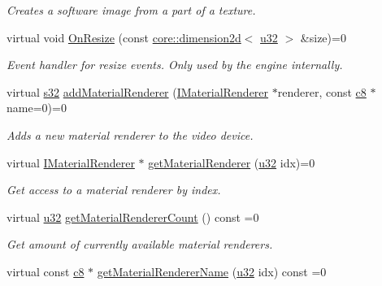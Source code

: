 \begin{DoxyCompactItemize}
\begin{DoxyCompactList}\small\item\em Creates a software image from a part of a texture. \end{DoxyCompactList}\item 
virtual void \hyperlink{classirr_1_1video_1_1IVideoDriver_a1a236e1233fc6fc2c5f36aaa830814fc}{On\+Resize} (const \hyperlink{classirr_1_1core_1_1dimension2d}{core\+::dimension2d}$<$ \hyperlink{namespaceirr_a0416a53257075833e7002efd0a18e804}{u32} $>$ \&size)=0
\begin{DoxyCompactList}\small\item\em Event handler for resize events. Only used by the engine internally. \end{DoxyCompactList}\item 
virtual \hyperlink{namespaceirr_ac66849b7a6ed16e30ebede579f9b47c6}{s32} \hyperlink{classirr_1_1video_1_1IVideoDriver_a0dfc3a7168f3a73a6f4323b579f03ff6}{add\+Material\+Renderer} (\hyperlink{classirr_1_1video_1_1IMaterialRenderer}{I\+Material\+Renderer} $\ast$renderer, const \hyperlink{namespaceirr_a9395eaea339bcb546b319e9c96bf7410}{c8} $\ast$name=0)=0
\begin{DoxyCompactList}\small\item\em Adds a new material renderer to the video device. \end{DoxyCompactList}\item 
virtual \hyperlink{classirr_1_1video_1_1IMaterialRenderer}{I\+Material\+Renderer} $\ast$ \hyperlink{classirr_1_1video_1_1IVideoDriver_accb321dfb32ad3c76efb99427bc90cc8}{get\+Material\+Renderer} (\hyperlink{namespaceirr_a0416a53257075833e7002efd0a18e804}{u32} idx)=0
\begin{DoxyCompactList}\small\item\em Get access to a material renderer by index. \end{DoxyCompactList}\item 
virtual \hyperlink{namespaceirr_a0416a53257075833e7002efd0a18e804}{u32} \hyperlink{classirr_1_1video_1_1IVideoDriver_ac1d0e2e952afdcdbdd915dc106375381}{get\+Material\+Renderer\+Count} () const =0
\begin{DoxyCompactList}\small\item\em Get amount of currently available material renderers. \end{DoxyCompactList}\item 
virtual const \hyperlink{namespaceirr_a9395eaea339bcb546b319e9c96bf7410}{c8} $\ast$ \hyperlink{classirr_1_1video_1_1IVideoDriver_ac6f8c53abcd5a24d94c84185b0ef65e0}{get\+Material\+Renderer\+Name} (\hyperlink{namespaceirr_a0416a53257075833e7002efd0a18e804}{u32} idx) const =0

\end{DoxyCompactItemize}
